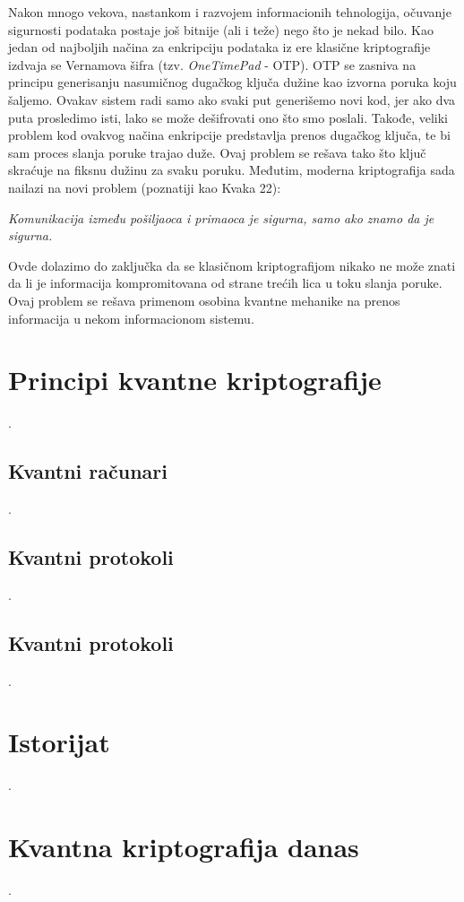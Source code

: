 \documentclass[a4paper]{article}
\begin{document}
Nakon mnogo vekova, nastankom i razvojem informacionih tehnologija, očuvanje sigurnosti podataka postaje još bitnije (ali i teže) nego što je nekad bilo. Kao jedan od najboljih načina za enkripciju podataka iz ere klasične kriptografije izdvaja se Vernamova šifra (tzv. \textit{OneTimePad} - OTP). OTP se zasniva na principu generisanju nasumičnog dugačkog ključa dužine kao izvorna poruka koju šaljemo. Ovakav sistem radi samo ako svaki put generišemo novi kod, jer ako dva puta prosledimo isti, lako se može dešifrovati ono što smo poslali. Takođe, veliki problem kod ovakvog načina enkripcije predstavlja prenos dugačkog ključa, te bi sam proces slanja poruke trajao duže. Ovaj problem se rešava tako što ključ skraćuje na fiksnu dužinu za svaku poruku. Međutim, moderna kriptografija sada nailazi na novi problem (poznatiji kao Kvaka 22):

 \begin{center}
\textit{Komunikacija između pošiljaoca i primaoca je sigurna, samo ako znamo da je sigurna.}
\end{center} 

Ovde dolazimo do zaključka da se klasičnom kriptografijom nikako ne može znati da li je informacija kompromitovana od strane trećih lica u toku slanja poruke. Ovaj problem se rešava primenom osobina kvantne mehanike na prenos informacija u nekom informacionom sistemu.

\section{Principi kvantne kriptografije}
.
\subsection{Kvantni računari}
.
\subsection{Kvantni protokoli}
.
\subsection{Kvantni protokoli}
.
\section{Istorijat}	
\label{sec:termini_i_citiranje}

.
\section{Kvantna kriptografija danas}
.
\end{document}
